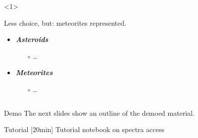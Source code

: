 \begin{frame}
\begin{columns}[T]
    \begin{column}{.7\textwidth}
      \begin{overlayarea}{\textwidth}{\textheight}
        \begin{onlyenv}<1>

          \vspace{1em}
          Less choice, but: meteorites represented.\\
          \vspace{1em}
          \begin{itemize}[<.->]
            \item \emph{\bf Asteroids}
              \begin{itemize}[<.->]
                \item[$\circ$] \dots
              \end{itemize}

            \vspace{0.5em}
            \item \emph{\bf Meteorites}
              \begin{itemize}[<.->]
                \item[$\circ$] \dots
              \end{itemize}

          \end{itemize}
        \end{onlyenv}
      \end{overlayarea}
    \end{column}

  \end{columns}

\end{frame}

\begin{frame}[t]{Demo}
  The next slides show an outline of the demoed material.
\end{frame}

\begin{frame}[t]{Tutorial}
  [20min] Tutorial notebook on spectra access
\end{frame}

